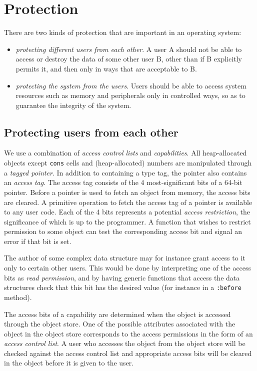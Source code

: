 \chapter{Protection}
\label{chap-protection}

There are two kinds of protection that are important in an operating
system:

\begin{itemize}
\item \emph{protecting different users from each other}.  A user A
  should not be able to access or destroy the data of some other user
  B, other than if B explicitly permits it, and then only in ways that
  are acceptable to B.
\item \emph{protecting the system from the users}.  Users should be
  able to access system resources such as memory and peripherals only
  in controlled ways, so as to guarantee the integrity of the system.
\end{itemize}

\section{Protecting users from each other}

We use a combination of \emph{access control lists} and
\emph{capabilities}.  All heap-allocated objects except \texttt{cons}
cells and (heap-allocated) numbers are manipulated through a
\emph{tagged pointer}.  In addition to containing a type tag, the
pointer also contains an \emph{access tag}.  The access tag consists
of the 4 most-significant bits of a 64-bit pointer.  Before a pointer
is used to fetch an object from memory, the access bits are cleared.
A primitive operation to fetch the access tag of a pointer is
available to any user code.  Each of the 4 bits represents a potential
\emph{access restriction}, the significance of which is up to the
programmer.  A function that wishes to restrict permission to some
object can test the corresponding access bit and signal an error if
that bit is set.

The author of some complex data structure may for instance grant
access to it only to certain other users.  This would be done by
interpreting one of the access bits as \emph{read permission}, and by
having generic functions that access the data structures check that
this bit has the desired value (for instance in a \texttt{:before}
method). 

The access bits of a capability are determined when the object is
accessed through the object store.   One of
the possible attributes associated with the object in the object store
corresponds to the access permissions in the form of an \emph{access
  control list}.  A user who accesses the object from the object store
will be checked against the access control list and appropriate access
bits will be cleared in the object before it is given to the user.

